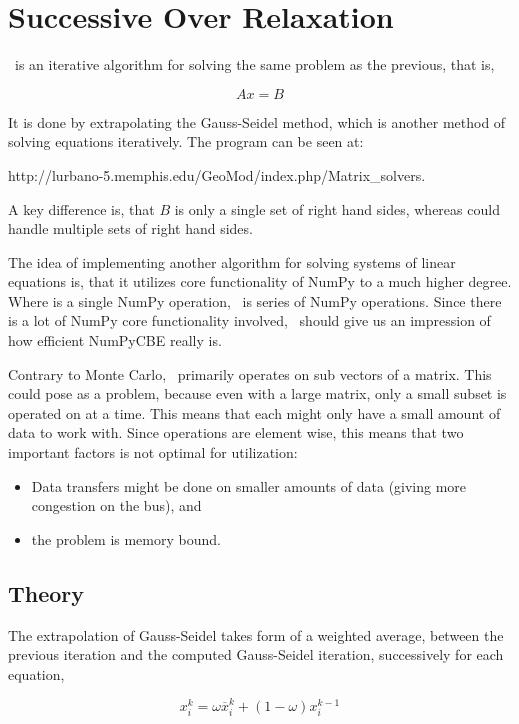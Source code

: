\section{Successive Over Relaxation}

\SOR\ is an iterative algorithm for solving the same problem as the previous, that is,

\[
Ax = B
\]

It is done by extrapolating the Gauss-Seidel
method\cite{mathworld-sor}, which is another method of solving
equations iteratively. The program can be seen at:

http://lurbano-5.memphis.edu/GeoMod/index.php/Matrix\_solvers.

A key difference is, that $B$ is only a single set of right hand
sides, whereas  could handle multiple sets of right
hand sides.

The idea of implementing another algorithm for solving systems of
linear equations is, that it utilizes core functionality of NumPy to a
much higher degree. Where  is a single NumPy
operation, \SOR\ is series of NumPy operations. Since there is a lot
of NumPy core functionality involved, \SOR\ should give us an
impression of how efficient NumPyCBE really is. 

Contrary to Monte Carlo, \SOR\ primarily operates on sub vectors of a
matrix. This could pose as a problem, because even with a large
matrix, only a small subset is operated on at a time.
This means that each \SPE{} might only have a small amount of data to work with.
Since operations are element wise, this means that two important factors
is not optimal for \SPE{} utilization:

\begin{itemize}
\item{Data transfers might be done on smaller amounts of data
(giving more congestion on the bus)}, and
\item{the problem is memory bound.}
\end{itemize}

\subsection{Theory}

The extrapolation of Gauss-Seidel takes form of a weighted average,
between the previous iteration and the computed Gauss-Seidel
iteration, successively for each equation\cite{mathworld-sor},

\[
x_{i}^k = \omega \overline{x}_i^k + (1-\omega)x_i^{k-1}
\]

